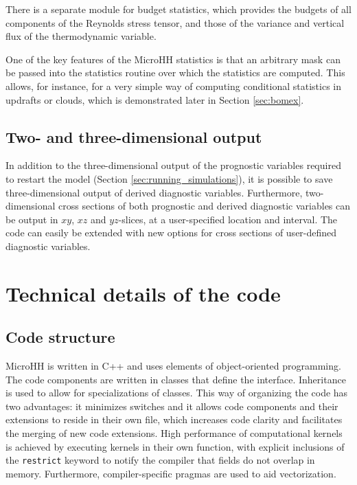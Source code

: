 \documentclass[gmd]{copernicus}
\begin{document}
There is a separate module for budget statistics, which provides the budgets of all components of the Reynolds stress tensor, and those of the variance and vertical flux of the thermodynamic variable.

One of the key features of the MicroHH statistics is that an arbitrary mask can be passed into the statistics routine over which the statistics are computed. This allows, for instance, for a very simple way of computing conditional statistics in updrafts or clouds, which is demonstrated later in Section \ref{sec:bomex}.

\subsection{Two- and three-dimensional output}

In addition to the three-dimensional output of the prognostic variables required to restart the model (Section \ref{sec:running_simulations}), it is possible to save three-dimensional output of derived diagnostic variables. Furthermore, two-dimensional cross sections of both prognostic and derived diagnostic variables can be output in $xy$, $xz$ and $yz$-slices, at a user-specified location and interval. The code can easily be extended with new options for cross sections of user-defined diagnostic variables. 

\section{Technical details of the code}\label{sec:technical}
\subsection{Code structure}
MicroHH is written in C++ and uses elements of object-oriented programming. The code components are written in classes that define the interface. Inheritance is used to allow for specializations of classes. This way of organizing the code has two advantages: it minimizes switches and it allows code components and their extensions to reside in their own file, which increases code clarity and facilitates the merging of new code extensions. High performance of computational kernels is achieved by executing kernels in their own function, with explicit inclusions of the \texttt{restrict} keyword to notify the compiler that fields do not overlap in memory. Furthermore, compiler-specific pragmas are used to aid vectorization.
\end{document}
